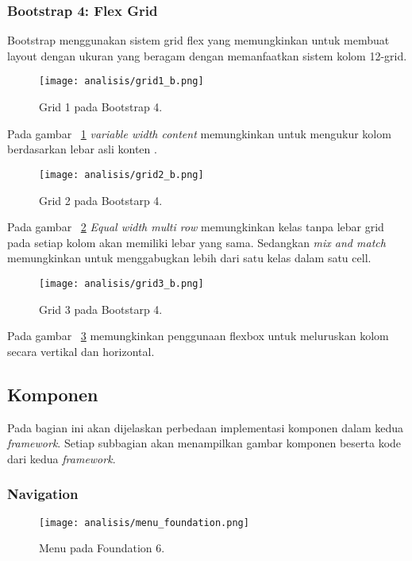 \subsubsection{Bootstrap 4: Flex Grid}
Bootstrap menggunakan sistem grid flex yang memungkinkan untuk membuat layout dengan ukuran yang beragam dengan memanfaatkan sistem kolom 12-grid.\\
\begin{figure} [H]
	\centering  
	\texttt{[image: analisis/grid1\_b.png]}
	\caption{Grid 1 pada Bootstrap 4.}
	\label{fig:grid1b}
\end{figure}
Pada gambar ~\ref{fig:grid1b} \textit{variable width content} memungkinkan untuk mengukur kolom berdasarkan lebar asli konten .
\begin{figure} [H]
	\centering  
	\texttt{[image: analisis/grid2\_b.png]}
	\caption{Grid 2 pada Bootstarp 4.}
	\label{fig:grid2b}
\end{figure}
Pada gambar ~\ref{fig:grid2b} \textit{Equal width multi row } memungkinkan kelas tanpa lebar grid pada setiap kolom akan memiliki lebar yang sama. Sedangkan \textit{mix and match} memungkinkan untuk menggabugkan lebih dari satu kelas dalam satu cell.
\begin{figure} [H]
	\centering  
	\texttt{[image: analisis/grid3\_b.png]}
	\caption{Grid 3 pada Bootstarp 4.}
	\label{fig:grid3b}
\end{figure}
Pada gambar ~\ref{fig:grid3b} memungkinkan penggunaan flexbox untuk meluruskan kolom secara vertikal dan horizontal.

\subsection{Komponen}
Pada bagian ini akan dijelaskan perbedaan implementasi komponen dalam kedua \textit{framework}. Setiap subbagian akan menampilkan gambar komponen beserta kode dari kedua \textit{framework}.
\subsubsection{Navigation}
\begin{figure} [H]
	\centering  
	\texttt{[image: analisis/menu\_foundation.png]}  
	\caption{Menu pada Foundation 6.}
	\label{fig:menuFoundation}	 
\end{figure}

